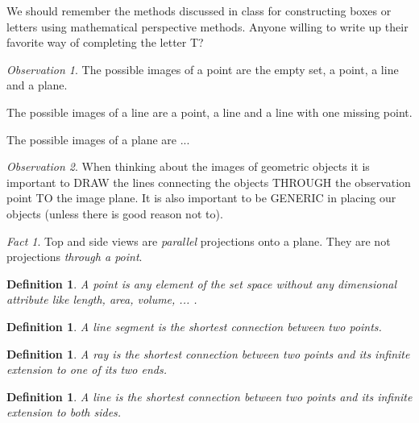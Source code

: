 \documentclass[12pt]{amsart}
\newtheorem{definition}[theorem]{Definition}
\theoremstyle{remark}
\newtheorem*{observation}{Observation}
\newtheorem*{basic notion}{Basic Notion}
\newtheorem{fact}{Fact}
\theoremstyle{mycomment}
\begin{document}
We should remember the methods discussed in class for constructing boxes or letters using mathematical perspective methods. Anyone willing to write up their favorite way of completing the letter T?

\begin{observation} The possible images of a point are the empty set, a point, a line and a plane.

The possible images of a line are a point, a line and a line with one missing point.

The possible images of a plane are ...
\end{observation}
\begin{observation} When thinking about the images of geometric objects it is important to DRAW the lines connecting the objects THROUGH the observation point TO the image plane. It is also important to be GENERIC in placing our objects (unless there is good reason not to).\end{observation}
\begin{fact} Top and side views are \emph{parallel} projections onto a plane. They are not projections \emph{through a point}.\end{fact}
\begin{definition} A \emph{point} is any element of the set space without any dimensional attribute like length, area, volume, ... .
\end{definition}
\begin{definition} A \emph{line segment} is the shortest connection between two points.
\end{definition}
\begin{definition} A \emph{ray} is the shortest connection between two points and its infinite extension to one of its two ends.
\end{definition}
\begin{definition} A \emph{line} is the shortest connection between two points and its infinite extension to both sides.
\end{definition}
\end{document}
